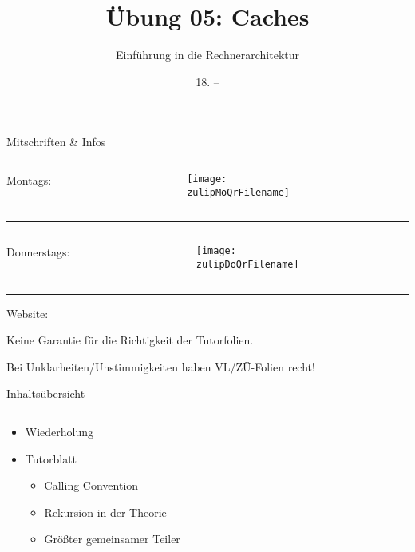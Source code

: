 \documentclass[
  german,            %
  aspectratio=169,    %
]{tumbeamer}
\title{Übung 05: Caches}
\subtitle{Einführung in die Rechnerarchitektur}
\author{\theAuthorName}
\institute{\theGroupName\\\theSchoolName\\\theUniversityName}
\date{18. -- \DTMdisplaydate{2024}{11}{24}{-1}}
\begin{document}
\maketitle

\begin{frame}[c]{Mitschriften \& Infos}{}
  \begin{minipage}[t]{\textwidth}
    \begin{columns}[c]
      \begin{column}{0.8\textwidth}
        Montags: \href{\zulipMo}{\zulipMo}
      \end{column}
      \begin{column}{0.2\textwidth}
        \texttt{[image: \\zulipMoQrFilename]}
      \end{column}
    \end{columns}
  \end{minipage}
  \rule{\textwidth}{0.4pt}
  \begin{minipage}[t]{\textwidth}
    \begin{columns}[c]
      \begin{column}{0.8\textwidth}
        Donnerstags: \href{\zulipDo}{\zulipDo}
      \end{column}
      \begin{column}{0.2\textwidth}
        \texttt{[image: \\zulipDoQrFilename]}
      \end{column}
    \end{columns}
  \end{minipage}
  \ifdefined\myWebsite
  \rule{\textwidth}{0.4pt}
  \centering
  Website: \href{\myWebsite}{\myWebsite}
  \fi
\end{frame}

\begin{frame}[c]{}{}
  \begin{center}
    \LARGE  Keine Garantie für die Richtigkeit der Tutorfolien.

    \Large Bei Unklarheiten/Unstimmigkeiten haben VL/ZÜ-Folien recht!
  \end{center}
\end{frame}

\begin{frame}[c]{Inhaltsübersicht}{}
  \begin{columns}[c]
    \begin{column}{1\textwidth}
      \begin{itemize}
        \item Wiederholung
        \item Tutorblatt
        \begin{itemize}
          \item Calling Convention
          \item Rekursion in der Theorie
          \item Größter gemeinsamer Teiler
        \end{itemize}
      \end{itemize}
    \end{column}
  \end{columns}
\end{frame}
\end{document}
